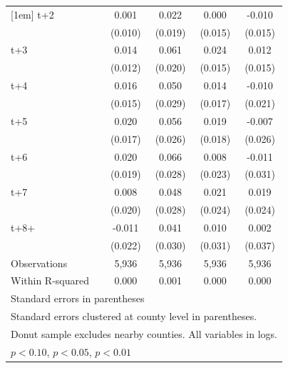 \begin{table}[htbp]
\begin{tabular}{l*{4}{c}}
[1em]
t+2         &       0.001         &       0.022         &       0.000         &      -0.010         \\
            &     (0.010)         &     (0.019)         &     (0.015)         &     (0.015)         \\
[1em]
t+3         &       0.014         &       0.061\sym{***}&       0.024         &       0.012         \\
            &     (0.012)         &     (0.020)         &     (0.015)         &     (0.015)         \\
[1em]
t+4         &       0.016         &       0.050\sym{*}  &       0.014         &      -0.010         \\
            &     (0.015)         &     (0.029)         &     (0.017)         &     (0.021)         \\
[1em]
t+5         &       0.020         &       0.056\sym{**} &       0.019         &      -0.007         \\
            &     (0.017)         &     (0.026)         &     (0.018)         &     (0.026)         \\
[1em]
t+6         &       0.020         &       0.066\sym{**} &       0.008         &      -0.011         \\
            &     (0.019)         &     (0.028)         &     (0.023)         &     (0.031)         \\
[1em]
t+7         &       0.008         &       0.048\sym{*}  &       0.021         &       0.019         \\
            &     (0.020)         &     (0.028)         &     (0.024)         &     (0.024)         \\
[1em]
t+8+        &      -0.011         &       0.041         &       0.010         &       0.002         \\
            &     (0.022)         &     (0.030)         &     (0.031)         &     (0.037)         \\
\hline
Observations&       5,936         &       5,936         &       5,936         &       5,936         \\
Within R-squared&       0.000         &       0.001         &       0.000         &       0.000         \\
\hline\hline
\multicolumn{5}{l}{\footnotesize Standard errors in parentheses}\\
\multicolumn{5}{l}{\footnotesize Standard errors clustered at county level in parentheses.}\\
\multicolumn{5}{l}{\footnotesize Donut sample excludes nearby counties. All variables in logs.}\\
\multicolumn{5}{l}{\footnotesize \sym{*} \(p<0.10\), \sym{**} \(p<0.05\), \sym{***} \(p<0.01\)}\\
\end{tabular}
\end{table}
